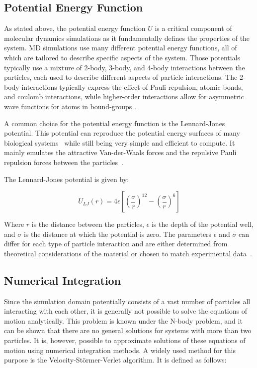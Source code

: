 \subsection{Potential Energy Function}

As stated above, the potential energy function $U$ is a critical component of molecular dynamics simulations as it fundamentally defines the properties of the system. MD simulations use many different potential energy functions, all of which are tailored to describe specific aspects of the system. Those potentials typically use a mixture of 2-body, 3-body, and 4-body interactions between the particles, each used to describe different aspects of particle interactions. The 2-body interactions typically express the effect of Pauli repulsion, atomic bonds, and coulomb interactions, while higher-order interactions allow for asymmetric wave functions for atoms in bound-groups \cite{Leimkuhler2015}.

A common choice for the potential energy function is the Lennard-Jones potential. This potential can reproduce the potential energy surfaces of many biological systems~\cite{NexusPhysicsLennardJones} while still being very simple and efficient to compute. It mainly emulates the attractive Van-der-Waals forces and the repulsive Pauli repulsion forces between the particles~\cite{ChemieLexikonLennardJones}.

The Lennard-Jones potential is given by:

\begin{equation}
      U_{LJ}(r) = 4 \epsilon \left[ \left( \frac{\sigma}{r} \right)^{12} - \left( \frac{\sigma}{r} \right)^6 \right]
\end{equation}


Where $r$ is the distance between the particles, $\epsilon$ is the depth of the potential well, and $\sigma$ is the distance at which the potential is zero. The parameters $\epsilon$ and $\sigma$ can differ for each type of particle interaction and are either determined from theoretical considerations of the material or chosen to match experimental data~\cite{Maghfiroh2020}.


\subsection{Numerical Integration}

Since the simulation domain potentially consists of a vast number of particles all interacting with each other, it is generally not possible to solve the equations of motion analytically. This problem is known under the N-body problem, and it can be shown that there are no general solutions for systems with more than two particles. It is, however, possible to approximate solutions of these equations of motion using numerical integration methods. A widely used method for this purpose is the Velocity-Störmer-Verlet algorithm. It is defined as follows:

